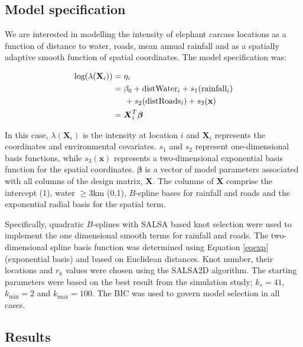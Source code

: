 \documentclass[letterpaper, 12pt]{interact}
\begin{document}
	
	\subsection*{Model specification}\label{model-specification-1}
	
	We are interested in modelling the intensity of elephant carcass locations as a function of distance to water, roads, mean annual rainfall and as a spatially adaptive smooth function of spatial coordinates. The model specification was:
	
	\begin{equation*}
		\begin{split}
			\textrm{log}(\lambda(\textbf{X}_i)) & = \eta_{i}\\
			& =\beta_0 + \textrm{distWater}_i + s_1(\textrm{rainfall}_i)\\
			& \hspace{0.5cm} + s_2(\textrm{distRoads}_i) + s_3(\mathbf{x})\\
			&  = \boldsymbol{X}_i^T \boldsymbol{\beta}
		\end{split}
	\end{equation*}
	
	
	In this case, \(\lambda(\textbf{X}_i)\) is the intensity at location $i$ and $\textbf{X}_i$ represents the coordinates and environmental covariates. $s_1$ and $s_2$ represent one-dimensional basis functions, while $s_3(\mathbf{x})$ represents a two-dimensional exponential basis function for the spatial coordinates. $\boldsymbol{\beta}$ is a vector of model parameters associated with all columns of the design matrix, $\mathbf{X}$. The columns of $\mathbf{X}$ comprise the intercept (1), water $\geq3$km (0,1), $B$-spline bases for rainfall and roads and the exponential radial basis for the spatial term. 
	
	Specifically, quadratic $B$-splines with SALSA based knot selection \cite{Walk2010} were used to implement the one dimensional smooth terms for rainfall and roads. The two-dimensional spline basis function was determined using Equation \ref{eqexp} (exponential basis) and based on Euclidean distances. Knot number, their locations and \(r_k\) values were chosen using the SALSA2D algorithm. The starting parameters were based on the best result from the simulation study; \(k_s = 41\), \(k_{\textrm{min}}=2\) and \(k_{\textrm{max}}=100\). The BIC was used to govern model selection in all cases. 
	
	
	\subsection*{Results}\label{results-1}
	
\end{document}
